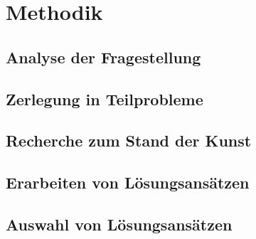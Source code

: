 \chapter{Methodik}
\label{chap:methodik}

\section{Analyse der Fragestellung}

\section{Zerlegung in Teilprobleme}

\section{Recherche zum Stand der Kunst}

\section{Erarbeiten von Lösungsansätzen}

\section{Auswahl von Lösungsansätzen}

